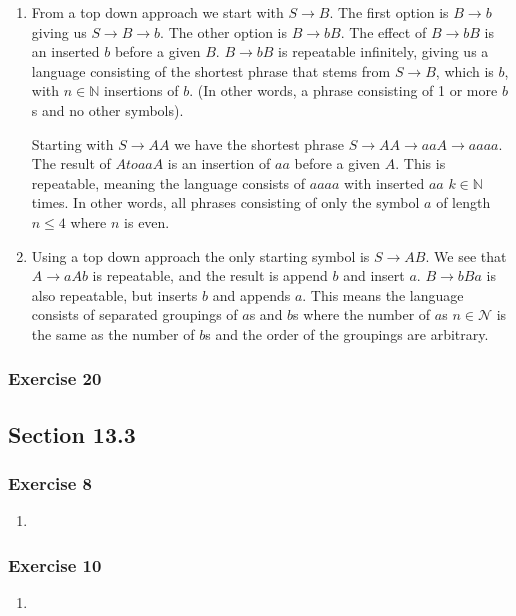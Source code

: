 \documentclass[a4paper]{article}
\newcommand{\ex}[1]{\subsubsection*{#1}}
\begin{document}
\begin{enumerate}[label=\alph*), start=4] %
    \item From a top down approach we start with \(S \to B\). The first option
        is \(B \to b\) giving us \(S \to B \to b\). The other option is \(B \to
        bB\). The effect of \(B \to bB\) is an inserted \(b\) before a given
        \(B\). \(B \to bB\) is repeatable infinitely, giving us a language
        consisting of the shortest phrase that stems from \(S \to B\), which is
        \(b\), with \(n \in \mathbb{N}\) insertions of \(b\). (In other words,
        a phrase consisting of 1 or more \(b\)s and no other symbols).

        Starting with \(S \to AA\) we have the shortest phrase \(S \to AA \to
        aaA \to aaaa\). The result of \(A to aaA\) is an insertion of \(aa\)
        before a given \(A\). This is repeatable, meaning the language consists
        of \(aaaa\) with inserted \(aa\) \(k \in \mathbb{N}\) times. In other
        words, all phrases consisting of only the symbol \(a\) of length \(n
        \leq 4\) where \(n\) is even.
    \item Using a top down approach the only starting symbol is \(S \to AB\).
        We see that \(A \to aAb\) is repeatable, and the result is append \(b\)
        and insert \(a\). \(B \to bBa\) is also repeatable, but inserts \(b\)
        and appends \(a\). This means the language consists of separated
        groupings of \(a\)s and \(b\)s where the number of \(a\)s \(n \in
        \mathcal{N}\) is the same as the number of \(b\)s and the order of the
        groupings are arbitrary.
\end{enumerate}

\ex{Exercise 20}



\subsection*{Section 13.3}

\ex{Exercise 8}

\begin{enumerate}[label=\alph*)]
    \item 
\end{enumerate}

\ex{Exercise 10}

\begin{enumerate}[label=\alph*)]
    \item 
\end{enumerate}
\end{document}
